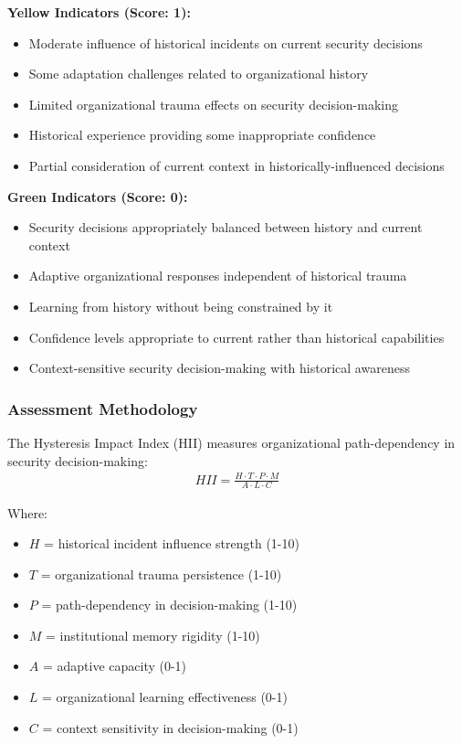 \documentclass[11pt,a4paper]{article}
\begin{document}
\textbf{Yellow Indicators (Score: 1):}
\begin{itemize}
\item Moderate influence of historical incidents on current security decisions
\item Some adaptation challenges related to organizational history
\item Limited organizational trauma effects on security decision-making
\item Historical experience providing some inappropriate confidence
\item Partial consideration of current context in historically-influenced decisions
\end{itemize}

\textbf{Green Indicators (Score: 0):}
\begin{itemize}
\item Security decisions appropriately balanced between history and current context
\item Adaptive organizational responses independent of historical trauma
\item Learning from history without being constrained by it
\item Confidence levels appropriate to current rather than historical capabilities
\item Context-sensitive security decision-making with historical awareness
\end{itemize}

\subsubsection{Assessment Methodology}

The Hysteresis Impact Index (HII) measures organizational path-dependency in security decision-making:
\begin{align}
HII = \frac{H \cdot T \cdot P \cdot M}{A \cdot L \cdot C}
\end{align}

Where:
\begin{itemize}
\item $H$ = historical incident influence strength (1-10)
\item $T$ = organizational trauma persistence (1-10)
\item $P$ = path-dependency in decision-making (1-10)
\item $M$ = institutional memory rigidity (1-10)
\item $A$ = adaptive capacity (0-1)
\item $L$ = organizational learning effectiveness (0-1)
\item $C$ = context sensitivity in decision-making (0-1)
\end{itemize}
\end{document}
